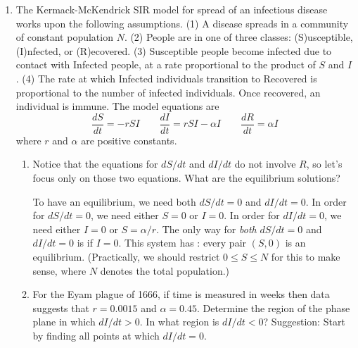 \documentclass[main]{subfiles}
\begin{document}
\begin{enumerate}
\begin{enumerate}
\end{enumerate} 


    
\item \label{SIR}

  The Kermack-McKendrick SIR model for spread of an infectious disease works upon
  the following assumptions.  (1) A disease spreads in a community of constant population $N$.
  (2) People are in one of three classes:  (S)usceptible, (I)nfected, or (R)ecovered.
  (3) Susceptible people become infected due to contact with Infected people, at a rate
      proportional to the product of $S$ and $I$.  
  (4) The rate at which Infected individuals transition to Recovered is proportional to the 
      number of infected individuals.  Once recovered, an individual is immune.
  The model equations are
  $$
    \frac{dS}{dt} = -r S I \qquad \frac{dI}{dt} = rSI - \alpha I \qquad \frac{dR}{dt} = \alpha I
  $$
  where $r$ and $\alpha$ are positive constants.

\begin{enumerate}

  \item
  \begin{problem}[0.5in]
    Notice that the equations for $dS/dt$ and $dI/dt$ do not involve $R$, so let's
    focus only on those two equations.  What are the equilibrium solutions?
  \end{problem}

  \begin{solution}
    To have an equilibrium, we need both $dS/dt = 0$ and $dI/dt = 0$.  In order
    for $dS/dt = 0$, we need either $S = 0$ or $I = 0$.  In order for $dI/dt = 0$,
    we need either $I = 0$ or $S = \alpha/r$.  The only way for {\em both}
    $dS/dt = 0$ and $dI/dt = 0$ is if $I = 0$.  This system has :  every pair $(S,0)$ is an equilibrium.
    (Practically, we should restrict $0 \leq S \leq N$ for this to make sense, where
    $N$ denotes the total population.)
  \end{solution}

   \item
  \begin{problem}[2in]
    For the Eyam plague of 1666, if time is measured in weeks then data suggests that
    $r = 0.0015$ and $\alpha = 0.45$.  Determine the region of the phase plane in
    which $dI/dt > 0$.  In what region is $dI/dt < 0$?  Suggestion:  Start by finding 
    all points at which $dI/dt = 0$. 
  \end{problem}


\end{enumerate}
\end{enumerate}
\end{document}
